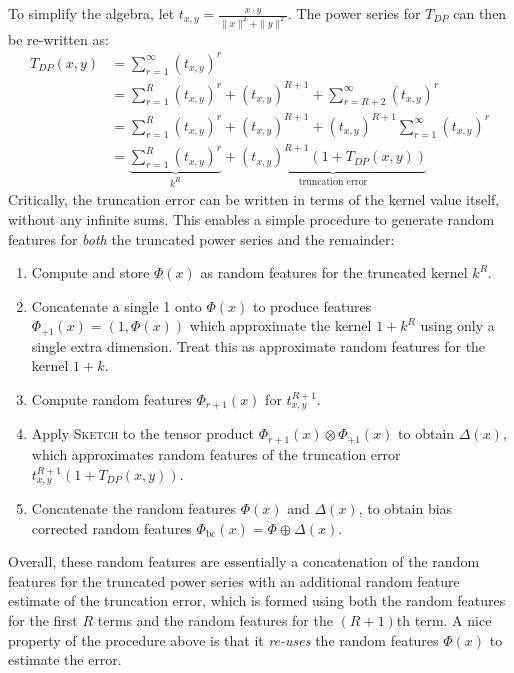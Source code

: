 To simplify the algebra,
let $t_{x,y}=\frac{x\cdot y}{\|x\|^2 + \|y\|^2}$.
The power series for $T_{DP}$ can then be re-written as:
\begin{align}
    T_{DP}(x,y) &= \sum_{r=1}^\infty \left(t_{x,y}\right)^r \nonumber\\
    &= \sum_{r=1}^{R} \left(t_{x,y}\right)^r + \left(t_{x,y}\right)^{R+1} + \sum_{r=R+2}^{\infty} \left(t_{x,y}\right)^r \nonumber\\
    &= \sum_{r=1}^{R} \left(t_{x,y}\right)^r + \left(t_{x,y}\right)^{R+1} + \left(t_{x,y}\right)^{R+1}\sum_{r=1}^{\infty} \left(t_{x,y}\right)^r \nonumber\\
    &= \underbrace{\sum_{r=1}^{R} \left(t_{x,y}\right)^r}_{k^{R}} + \underbrace{\left(t_{x,y}\right)^{R+1} \left(1 + T_{DP}(x,y)\right)}_{\text{truncation error}}
\end{align}
Critically, the truncation error can be written in terms of the kernel value itself, without any infinite sums.
This enables a simple procedure to generate random features for \emph{both} the truncated
power series and the remainder:
\begin{enumerate}
    \item Compute and store $\Phi(x)$ 
        as random features for the truncated kernel $k^{R}$.
    \item  Concatenate a single 1 onto $\Phi(x)$
        to produce features $\Phi_{+1}(x) = (1,\Phi(x))$ which approximate the kernel $1+k^{R}$
        using only a single extra dimension.
        Treat this as approximate random features for the kernel $1+k$.
    \item Compute random features $\Phi_{r+1}(x)$ for $t_{x,y}^{R+1}$.
    \item Apply \textsc{Sketch} to the tensor product $\Phi_{r+1}(x)\otimes \Phi_{+1}(x)$ to obtain $\Delta(x)$,
        which approximates random features of the truncation error 
        $t_{x,y}^{R+1}(1+T_{DP}(x,y))$.
    \item Concatenate the random features $\Phi(x)$ and $\Delta(x)$, to obtain bias corrected random features $\Phi_\text{bc}(x)=\Phi\oplus \Delta(x)$.
\end{enumerate}

Overall, these random features are essentially a concatenation of
the random features for the truncated power series
with an additional random feature estimate of the truncation error,
which is formed using both the random features for the first $R$ terms
and the random features for the $(R+1)$th term.
A nice property of the procedure above is that it \emph{re-uses}
the random features $\Phi(x)$ to estimate the error.